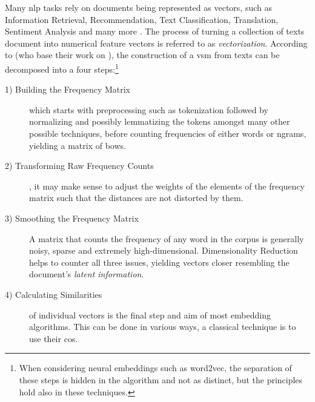 Many \gls{nlp} tasks rely on documents being represented as vectors, such as Information Retrieval, Recommendation, Text Classification, Translation, Sentiment Analysis and many more \cite{Smith2017,bird2009natural,Devlin2019,Le2014,Mikolov2013a,Turney2010,Guo,Chen2018,Maas2011}. The process of turning a collection of texts document into numerical feature vectors is referred to as \textit{vectorization}. According to \textcite{Turney2010} (who base their work on \textcite{Lowe}), the construction of a \gls{vsm} from texts can be decomposed into a four steps:\footnote{When considering neural embeddings such as \gls{word2vec}, the separation of these steps is hidden in the algorithm and not as distinct, but the principles hold also in these techniques.}


\begin{description}
    \item[1) Building the Frequency Matrix] which starts with preprocessing such as tokenization followed by normalizing and possibly \gls{lemma}tizing the tokens amongst many other possible techniques, before counting frequencies of either words or \glspl{ngram}, yielding a matrix of \glspl{bow}.
    \item[2) Transforming Raw Frequency Counts]  \cite{Turney2010}, it may make sense to adjust the weights of the elements of the frequency matrix such that the distances are not distorted by them.
    \item[3) Smoothing the Frequency Matrix] A matrix that counts the frequency of any word in the corpus is generally noisy, sparse and extremely high-dimensional. Dimensionality Reduction helps to counter all three issues, yielding vectors closer resembling the document's \textit{latent information}.
    \item[4) Calculating Similarities] of individual vectors is the final step and aim of most embedding algorithms. This can be done in various ways, a classical technique is to use their \gls{cos}.
\end{description}

